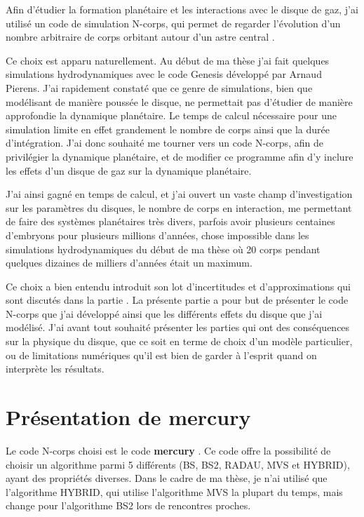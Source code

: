 Afin d'étudier la formation planétaire et les interactions avec le disque de gaz, j'ai utilisé un code de simulation N-corps, qui permet de regarder l'évolution d'un nombre arbitraire de corps orbitant autour d'un astre central \citep{chambers1999hybrid}. 

Ce choix est apparu naturellement. Au début de ma thèse j'ai fait quelques simulations hydrodynamiques avec le code Genesis développé par Arnaud Pierens. J'ai rapidement constaté que ce genre de simulations, bien que modélisant de manière poussée le disque, ne permettait pas d'étudier de manière approfondie la dynamique planétaire. Le temps de calcul nécessaire pour une simulation limite en effet grandement le nombre de corps ainsi que la durée d'intégration. J'ai donc souhaité me tourner vers un code N-corps, afin de privilégier la dynamique planétaire, et de modifier ce programme afin d'y inclure les effets d'un disque de gaz sur la dynamique planétaire. 

J'ai ainsi gagné en temps de calcul, et j'ai ouvert un vaste champ d'investigation sur les paramètres du disques, le nombre de corps en interaction, me permettant de faire des systèmes planétaires très divers, parfois avoir plusieurs centaines d'embryons pour plusieurs millions d'années, chose impossible dans les simulations hydrodynamiques du début de ma thèse où 20 corps pendant quelques dizaines de milliers d'années était un maximum. 

Ce choix a bien entendu introduit son lot d'incertitudes et d'approximations qui sont discutés dans la partie . La présente partie a pour but de présenter le code N-corps que j'ai développé ainsi que les différents effets du disque que j'ai modélisé. J'ai avant tout souhaité présenter les parties qui ont des conséquences sur la physique du disque, que ce soit en terme de choix d'un modèle particulier, ou de limitations numériques qu'il est bien de garder à l'esprit quand on interprète les résultats.

\section{Présentation de mercury}
Le code N-corps choisi est le code \textbf{mercury} \citep{chambers1999hybrid}. Ce code offre la possibilité de choisir un algorithme parmi 5 différents (BS, BS2, RADAU, MVS et HYBRID), ayant des propriétés diverses. Dans le cadre de ma thèse, je n'ai utilisé que l'algorithme HYBRID, qui utilise l'algorithme MVS la plupart du temps, mais change pour l'algorithme BS2 lors de rencontres proches. 

